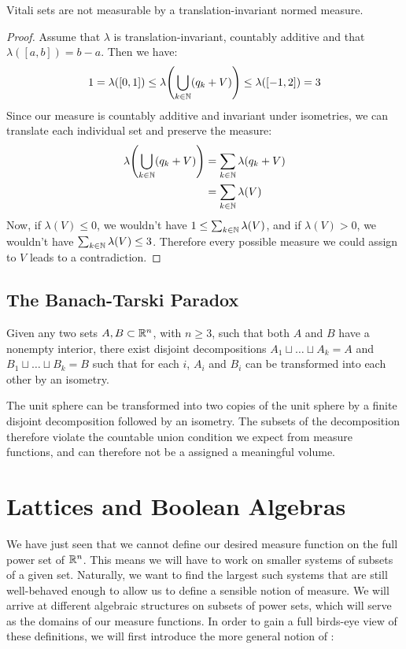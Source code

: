 \begin{corollary}
	Vitali sets are not measurable by a translation-invariant normed measure.
\end{corollary}
\begin{proof}
	Assume that $\lambda$ is translation-invariant, countably additive and that $\lambda([a,b]) = b-a$. Then we have:
	\begin{align*}
		1 = \lambda([0,1]) \leq \lambda\qty(\bigcup_{k \in \mathbb{N}} (q_k + V)) \leq \lambda\qty([-1,2]) = 3
	\end{align*}
	Since our measure is countably additive and invariant under isometries, we can translate each individual set and preserve the measure:
	\begin{align*}
		\lambda\qty(\bigcup_{k \in \mathbb{N}} (q_k + V)) 
		&= \sum_{k \in \mathbb{N}} \lambda\qty(q_k + V)\\
		&= \sum_{k \in \mathbb{N}} \lambda\qty(V)
	\end{align*}
	Now, if $\lambda(V) \leq 0$, we wouldn't have $1 \leq \sum_{k \in \mathbb{N}} \lambda\qty(V)$, and if $\lambda(V) > 0$, we wouldn't have $\sum_{k \in \mathbb{N}} \lambda\qty(V) \leq 3$. Therefore every possible measure we could assign to $V$ leads to a contradiction.
\end{proof}
\subsection{The Banach-Tarski Paradox}
\begin{theorem}
	Given any two sets $A,B \subset \mathbb{R}^n$, with $n \geq 3$, such that both $A$ and $B$ have a nonempty interior, there exist disjoint decompositions $A_1 \sqcup \hdots \sqcup A_k = A$ and $B_1 \sqcup \hdots \sqcup B_k = B$ such that for each $i$, $A_i$ and $B_i$ can be transformed into each other by an isometry.
\end{theorem}

\begin{corollary}
	The unit sphere can be transformed into two copies of the unit sphere by a finite disjoint decomposition followed by an isometry. The subsets of the decomposition therefore violate the countable union condition we expect from measure functions, and can therefore not be a assigned a meaningful volume.
\end{corollary}		

\clearpage

\section{Lattices and Boolean Algebras}
We have just seen that we cannot define our desired measure function on the full power set of $\mathbb{R}^n$. This means we will have to work on smaller systems of subsets of a given set. Naturally, we want to find the largest such systems that are still well-behaved enough to allow us to define a sensible notion of measure.
\newpar
We will arrive at different algebraic structures on subsets of power sets, which will serve as the domains of our measure functions.
\newpar
In order to gain a full birds-eye view of these definitions, we will first introduce the more general notion of :

